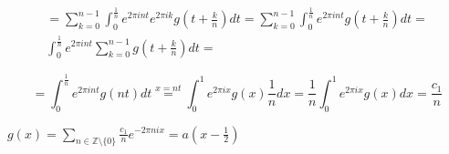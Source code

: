 \documentclass{article}
\begin{document}
\begin{multline*}
= \sum_{k=0}^{n-1} \int_{0}^{\frac{1}{n}} e^{2\pi i n t} e^{2\pi i k} g(t + \frac{k}{n}) dt = \sum_{k=0}^{n-1} \int_{0}^{\frac{1}{n}} e^{2\pi i n t} g(t + \frac{k}{n}) dt = \\
\int_{0}^{\frac{1}{n}}e^{2\pi i n t}\sum_{k=0}^{n-1} g(t + \frac{k}{n}) dt =
\end{multline*}

\[ = \int_{0}^{\frac{1}{n}}e^{2\pi i n t} g(nt) dt \overset{x=nt}{=} \int_{0}^{1}e^{2\pi i x} g(x) \frac{1}{n}dx = \frac{1}{n} \int_{0}^{1}e^{2\pi i x} g(x) dx = \frac{c_{1}}{n} \]

\( g(x) = \sum_{n \in \mathbb{Z} \setminus \{ 0 \}} \frac{c_{1}}{n} e^{-2\pi n i x} = a(x-\frac{1}{2}) \)
\end{document}
